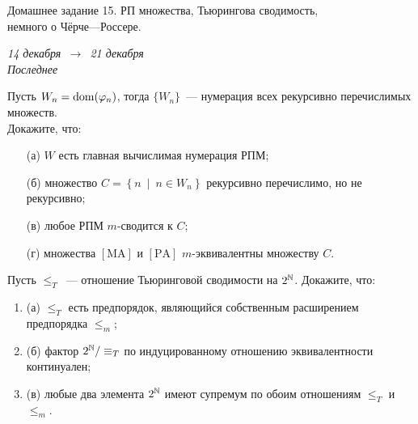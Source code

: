 \documentclass[letterpaper,11pt]{article}
\DeclareMathOperator{\Dom}{dom}
\begin{document}
   \pagestyle{empty}

   \newcommand{\enumsep}{\vspace{-2.8mm}
   		\begin{enumerate}[itemsep=0.4mm,leftmargin=2.5mm]}

\begin{center}
	{\Large Домашнее задание 15. РП множества, Тьюрингова сводимость,
	\smallskip \\ 
	немного о Чёрче—Россере.}

	{\it 14 декабря\ \(\to\)\ 21 декабря} \\
	{\it Последнее}
\end{center}


   \item Пусть $W_n=\Dom\lr*{\varphi_n}$, тогда $\{W_n\}$~— нумерация всех рекурсивно перечислимых множеств. \\ Докажите, что: \enumsep
	\item[(а)] $W$ есть главная вычислимая нумерация РПМ;
	\item[(б)] множество $C=\left\{ n\:\middle\vert\: n\in W_n\right\}$ рекурсивно перечислимо, но не рекурсивно;
	\item[(в)] любое РПМ  $m$-сводится к $C$;
	\item[(г)] множества \(\left[\text{MA}\right]\) и \(\left[\text{PA}\right]\) $m$-эквивалентны множеству $C$.
   \end{enumerate}

   \item Пусть $\leq_T$~— отношение Тьюринговой сводимости на $2^{\mathbb N}$. Докажите, что: \enumsep
	\item[(а)] $\leq_T$ есть предпорядок, являющийся собственным расширением предпорядка $\leq_m$;
	\item[(б)] фактор $2^{\mathbb N} /\equiv_T$ по индуцированному отношению эквивалентности  континуален;
	\item[(в)] любые два элемента $2^{\mathbb N}$ имеют супремум по обоим отношениям $\leq_T$ и $\leq_m$.
   \end{enumerate}
\end{document}
